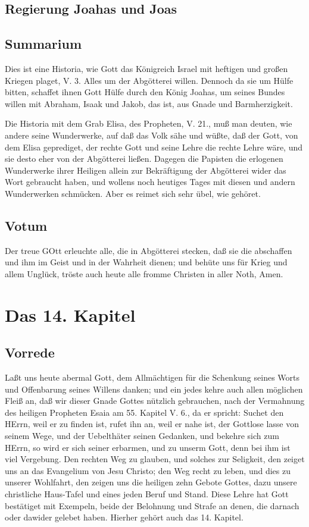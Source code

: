 \section{Regierung Joahas und Joas}

\section{Summarium}

Dies ist eine Historia, wie Gott das Königreich Israel mit heftigen und großen Kriegen plaget, V. 3. Alles um der Abgötterei willen. Dennoch da sie um Hülfe bitten, schaffet ihnen Gott Hülfe durch den König Joahas, um seines Bundes willen mit Abraham, Isaak und Jakob, das ist, aus Gnade und Barmherzigkeit.

Die Historia mit dem Grab Elisa, des Propheten, V. 21., muß man deuten, wie andere seine Wunderwerke, auf daß das Volk sähe und wüßte, daß der Gott, von dem Elisa geprediget, der rechte Gott und seine Lehre die rechte Lehre wäre, und sie desto eher von der Abgötterei ließen. Dagegen die Papisten die erlogenen Wunderwerke ihrer Heiligen allein zur Bekräftigung der Abgötterei wider das Wort gebraucht haben, und wollens noch heutiges Tages mit diesen und andern Wunderwerken schmücken. Aber es reimet sich sehr übel, wie gehöret.

\section{Votum}

Der treue GOtt erleuchte alle, die in Abgötterei stecken, daß sie die abschaffen und ihm im Geist und in der Wahrheit dienen; und behüte uns für Krieg und allem Unglück, tröste auch heute alle fromme Christen in aller Noth, Amen.

\chapter{Das 14. Kapitel}

\section{Vorrede}

Laßt uns heute abermal Gott, dem Allmächtigen für die Schenkung seines Worts und Offenbarung seines Willens danken; und ein jedes kehre auch allen möglichen Fleiß an, daß wir dieser Gnade Gottes nützlich gebrauchen, nach der Vermahnung des heiligen Propheten Esaia am 55. Kapitel V. 6., da er spricht: Suchet den HErrn, weil er zu finden ist, rufet ihn an, weil er nahe ist, der Gottlose lasse von seinem Wege, und der Uebelthäter seinen Gedanken, und bekehre sich zum HErrn, so wird er sich seiner erbarmen, und zu unserm Gott, denn bei ihm ist viel Vergebung. Den rechten Weg zu glauben, und solches zur Seligkeit, den zeiget uns an das Evangelium von Jesu Christo; den Weg recht zu leben, und dies zu unserer Wohlfahrt, den zeigen uns die heiligen zehn Gebote Gottes, dazu unsere christliche Haus-Tafel und eines jeden Beruf und Stand. Diese Lehre hat Gott bestätiget mit Exempeln, beide der Belohnung und Strafe an denen, die darnach oder dawider gelebet haben. Hierher gehört auch das 14. Kapitel.

